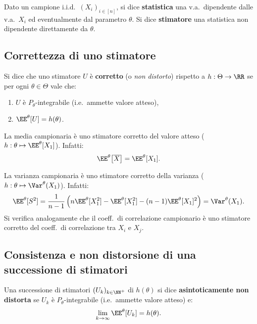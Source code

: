 \begin{multicols*}{2}
\begin{definition}
    Dato un campione i.i.d.~$(X_i)_{i \in [n]}$, si dice \textbf{statistica}
    una v.a.~dipendente dalle v.a.~$X_i$ ed eventualmente dal parametro $\theta$.
    Si dice \textbf{stimatore} una statistica non dipendente direttamente da $\theta$.
\end{definition}

\subsection{Correttezza di uno stimatore}

\begin{definition}
    Si dice che uno stimatore $U$ è \textbf{corretto} (o \textit{non distorto}) rispetto
    a $h : \Theta \to \RR$ se per ogni $\theta \in \Theta$ vale che:
    \begin{enumerate}[(i.)]
        \item $U$ è $P_\theta$-integrabile (i.e.~ammette valore atteso),
        \item $\EE^\theta[U] = h(\theta)$.
    \end{enumerate}
\end{definition}

\begin{remark}
    La media campionaria è uno stimatore corretto del valore atteso ($h : \theta \mapsto \EE^\theta[X_1]$). Infatti:
    \[
        \EE^\theta\!\left[\overline{X}\right] = \EE^\theta[X_1].
    \]
\end{remark}

\begin{remark}
    La varianza campionaria è uno stimatore corretto della varianza ($h : \theta \mapsto \Var^\theta(X_1)$). Infatti:
    \[
        \EE^\theta[S^2] = \frac{1}{n-1} \left( n \EE^\theta[X_1^2] - \EE^\theta[X_1^2] - (n-1) \EE^\theta[X_1]^2 \right) = \Var^\theta(X_1).
    \]
    Si verifica analogamente che il coeff.~di correlazione campionario è uno stimatore corretto del
    coeff.~di correlazione tra $X_i$ e $X_j$.
\end{remark}

\subsection{Consistenza e non distorsione di una successione di stimatori}

\begin{definition}
    Una successione di stimatori $(U_k)_{k \in \NN^+}$ di $h(\theta)$ si dice
    \textbf{asintoticamente non distorta} se $U_k$ è $P_\theta$-integrabile
    (i.e.~ammette valore atteso) e:
    \[
        \lim_{k \to \infty} \EE^\theta[U_k] = h(\theta).
    \]
\end{definition}


\end{multicols*}

